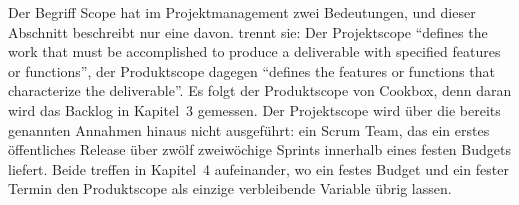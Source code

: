 %
%
Der Begriff Scope hat im Projektmanagement zwei Bedeutungen, und dieser Abschnitt beschreibt nur eine davon. \textcite[p.~52]{kerzner2022} trennt sie: Der Projektscope \enquote{defines the work that must be accomplished to produce a deliverable with specified features or functions}, der Produktscope dagegen \enquote{defines the features or functions that characterize the deliverable}. Es folgt der Produktscope von Cookbox, denn daran wird das Backlog in Kapitel~3 gemessen. Der Projektscope wird über die bereits genannten Annahmen hinaus nicht ausgeführt: ein Scrum Team, das ein erstes öffentliches Release über zwölf zweiwöchige Sprints innerhalb eines festen Budgets liefert. Beide treffen in Kapitel~4 aufeinander, wo ein festes Budget und ein fester Termin den Produktscope als einzige verbleibende Variable übrig lassen.

